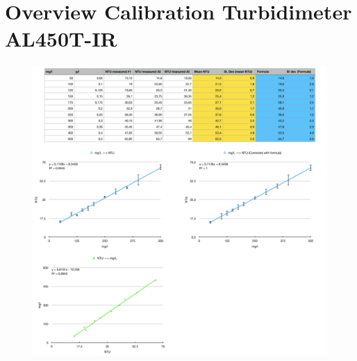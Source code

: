 \chapter{Overview Calibration Turbidimeter AL450T-IR}
\label{app:Calibration_Turbidity}

\begin{figure}[ht!]
    \centering
    \includegraphics[width=\linewidth]{Images/Overview_NTU_samples.png}
\end{figure}

